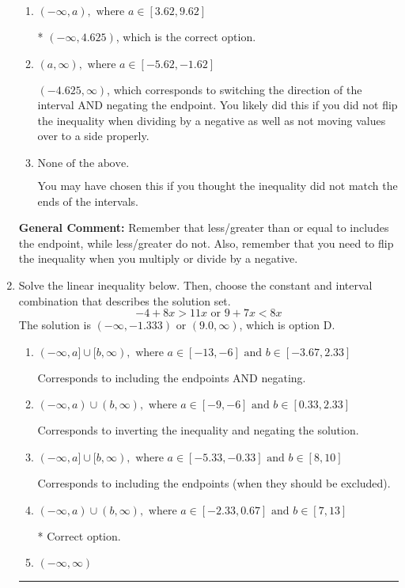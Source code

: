\documentclass{extbook}[14pt]
\newcommand{\litem}[1]{\item #1

\rule{\textwidth}{0.4pt}}
\begin{document}
\begin{enumerate}
{\begin{enumerate}[label=\Alph*.]
 $(4.625, \infty)$, which corresponds to switching the direction of the interval. You likely did this if you did not flip the inequality when dividing by a negative!
\item \( (-\infty, a), \text{ where } a \in [3.62, 9.62] \)

* $(-\infty, 4.625)$, which is the correct option.
\item \( (a, \infty), \text{ where } a \in [-5.62, -1.62] \)

 $(-4.625, \infty)$, which corresponds to switching the direction of the interval AND negating the endpoint. You likely did this if you did not flip the inequality when dividing by a negative as well as not moving values over to a side properly.
\item \( \text{None of the above}. \)

You may have chosen this if you thought the inequality did not match the ends of the intervals.
\end{enumerate}

\textbf{General Comment:} Remember that less/greater than or equal to includes the endpoint, while less/greater do not. Also, remember that you need to flip the inequality when you multiply or divide by a negative.
}
\litem{
Solve the linear inequality below. Then, choose the constant and interval combination that describes the solution set.
\[ -4 + 8 x > 11 x \text{ or } 9 + 7 x < 8 x \]The solution is \( (-\infty, -1.333) \text{ or } (9.0, \infty) \), which is option D.\begin{enumerate}[label=\Alph*.]
\item \( (-\infty, a] \cup [b, \infty), \text{ where } a \in [-13, -6] \text{ and } b \in [-3.67, 2.33] \)

Corresponds to including the endpoints AND negating.
\item \( (-\infty, a) \cup (b, \infty), \text{ where } a \in [-9, -6] \text{ and } b \in [0.33, 2.33] \)

Corresponds to inverting the inequality and negating the solution.
\item \( (-\infty, a] \cup [b, \infty), \text{ where } a \in [-5.33, -0.33] \text{ and } b \in [8, 10] \)

Corresponds to including the endpoints (when they should be excluded).
\item \( (-\infty, a) \cup (b, \infty), \text{ where } a \in [-2.33, 0.67] \text{ and } b \in [7, 13] \)

 * Correct option.
\item \( (-\infty, \infty) \)


\end{enumerate}}
\end{enumerate}
\end{document}
